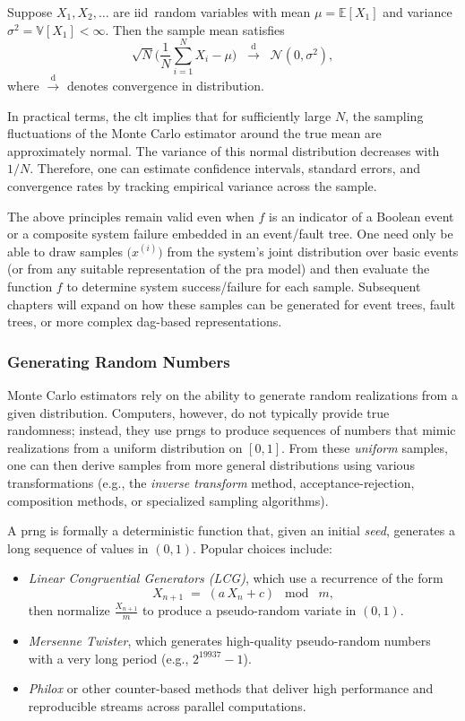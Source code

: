 \begin{theorem}
\label{thm:CLT}
Suppose \(X_1, X_2,\dots\) are \acrshort{iid}\ random variables with mean \(\mu=\mathbb{E}[X_1]\) and variance \(\sigma^2=\mathbb{V}[X_1]<\infty\). Then the sample mean satisfies
\[
\sqrt{N}
\biggl(
 \frac{1}{N}\sum_{i=1}^N X_i - \mu
\biggr)
\;\;\xrightarrow{\mathrm{d}}\;\;
\mathcal{N}(0,\sigma^2),
\]
where \(\xrightarrow{\mathrm{d}}\) denotes convergence in distribution.
\end{theorem}

In practical terms, the \acrfull{clt} implies that for sufficiently large \(N\), the sampling fluctuations of the Monte Carlo estimator around the true mean are approximately normal. The variance of this normal distribution decreases with \(1/N\). Therefore, one can estimate confidence intervals, standard errors, and convergence rates by tracking empirical variance across the sample.

The above principles remain valid even when \(f\) is an indicator of a Boolean event or a composite system failure embedded in an event/fault tree. One need only be able to draw samples \(\bigl(x^{(i)}\bigr)\) from the system's joint distribution over basic events (or from any suitable representation of the \acrshort{pra} model) and then evaluate the function \(f\) to determine system success/failure for each sample. Subsequent chapters will expand on how these samples can be generated for event trees, fault trees, or more complex \acrshort{dag}-based representations.

\subsubsection{Generating Random Numbers}
Monte Carlo estimators rely on the ability to generate random realizations from a given distribution. Computers, however, do not typically provide true randomness; instead, they use \acrfull{prng}s to produce sequences of numbers that mimic realizations from a uniform distribution on \([0,1]\). From these \emph{uniform} samples, one can then derive samples from more general distributions using various transformations (e.g., the \emph{inverse transform} method, acceptance-rejection, composition methods, or specialized sampling algorithms).

A \acrshort{prng} is formally a deterministic function that, given an initial \emph{seed}, generates a long sequence of values in \((0,1)\). Popular choices include:
\begin{itemize}
\item \emph{Linear Congruential Generators (LCG)}, which use a recurrence of the form
\[
X_{n+1}
\;=\;
(a\,X_n + c)
\;\bmod\; m,
\]
then normalize \(\frac{X_{n+1}}{m}\) to produce a pseudo-random variate in \((0,1)\).
\item \emph{Mersenne Twister}, which generates high-quality pseudo-random numbers with a very long period (e.g., \(2^{19937}-1\)).
\item \emph{Philox} or other counter-based methods that deliver high performance and reproducible streams across parallel computations.
\end{itemize}

